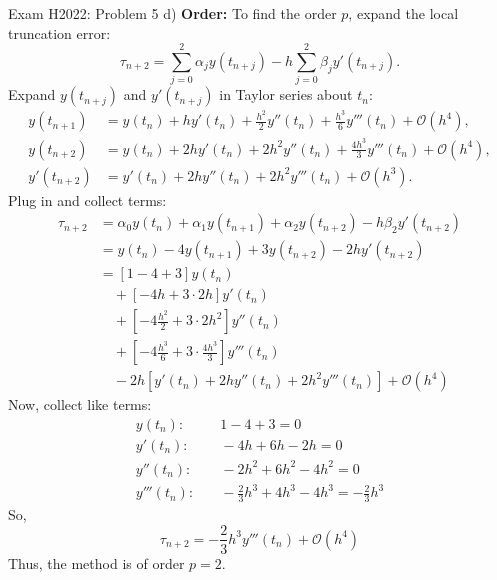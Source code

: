 \begin{example}{Exam H2022: Problem 5 d)}{}
  \textbf{Order:}
  To find the order $p$, expand the local truncation error:
  \[
    \tau_{n+2} = \sum_{j=0}^2 \alpha_j y(t_{n+j}) - h \sum_{j=0}^2 \beta_j y'(t_{n+j}).
  \]
  Expand $y(t_{n+j})$ and $y'(t_{n+j})$ in Taylor series about $t_n$:
  \begin{align*}
    y(t_{n+1})  & = y(t_n) + h y'(t_n) + \frac{h^2}{2} y''(t_n) + \frac{h^3}{6} y'''(t_n) + \mathcal{O}(h^4), \\
    y(t_{n+2})  & = y(t_n) + 2h y'(t_n) + 2h^2 y''(t_n) + \frac{4h^3}{3} y'''(t_n) + \mathcal{O}(h^4),        \\
    y'(t_{n+2}) & = y'(t_n) + 2h y''(t_n) + 2h^2 y'''(t_n) + \mathcal{O}(h^3).
  \end{align*}
  Plug in and collect terms:
  \begin{align*}
    \tau_{n+2} & = \alpha_0 y(t_n) + \alpha_1 y(t_{n+1}) + \alpha_2 y(t_{n+2}) - h \beta_2 y'(t_{n+2}) \\
               & = y(t_n) - 4 y(t_{n+1}) + 3 y(t_{n+2}) - 2h y'(t_{n+2})                               \\
               & = \left[1 - 4 + 3\right] y(t_n)                                                       \\
               & \quad + \left[-4 h + 3 \cdot 2h\right] y'(t_n)                                        \\
               & \quad + \left[-4 \tfrac{h^2}{2} + 3 \cdot 2h^2\right] y''(t_n)                        \\
               & \quad + \left[-4 \tfrac{h^3}{6} + 3 \cdot \tfrac{4h^3}{3}\right] y'''(t_n)            \\
               & \quad - 2h \left[y'(t_n) + 2h y''(t_n) + 2h^2 y'''(t_n)\right] + \mathcal{O}(h^4)
  \end{align*}
  Now, collect like terms:
  \begin{align*}
    y(t_n):    & \quad 1 - 4 + 3 = 0                                   \\
    y'(t_n):   & \quad -4h + 6h - 2h = 0                               \\
    y''(t_n):  & \quad -2h^2 + 6h^2 - 4h^2 = 0                         \\
    y'''(t_n): & \quad -\frac{2}{3}h^3 + 4h^3 - 4h^3 = -\frac{2}{3}h^3
  \end{align*}
  So,
  \[
    \tau_{n+2} = -\frac{2}{3} h^3 y'''(t_n) + \mathcal{O}(h^4)
  \]
  Thus, the method is of order $p=2$.


\end{example}
